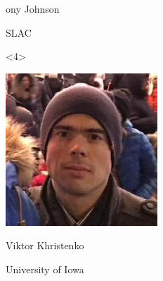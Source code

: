\documentclass{beamer}
\begin{document}
\begin{frame}{}
\begin{onlyenv}
\begin{minipage}{3 cm}
\begin{center}
{\begin{minipage}{2.3 cm}
ony Johnson

\centering SLAC
\end{minipage}\hspace{-3.2 cm}}
\end{center}
\end{minipage}\hspace{1 cm}\vspace{3.5 cm}
\end{onlyenv}
\begin{onlyenv}<4>
\vspace{-3.5 cm}\hfill\begin{minipage}{3 cm}
\begin{center}
\includegraphics[width=2 cm]{viktor.jpg}

Viktor Khristenko

{\small University of Iowa}
\end{center}
\end{minipage}\hspace{1 cm}\vspace{3.5 cm}
\end{onlyenv}

\end{frame}












\end{document}
